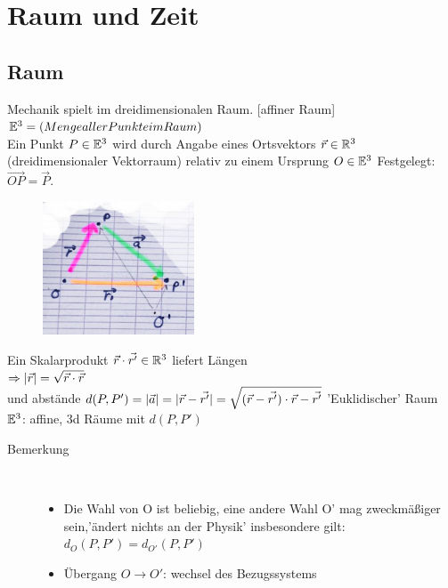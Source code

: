 \section{Raum und Zeit}
\subsection{Raum}
Mechanik spielt im dreidimensionalen Raum. [affiner Raum] $\mathbb{E}^3={\text(Menge aller Punkte im Raum)}$\\
Ein Punkt $P\in\mathbb{E}^3$ wird durch Angabe eines Ortsvektors $\vec{r}\in\mathbb{R}^3$ (dreidimensionaler Vektorraum) relativ zu einem Ursprung $O\in\mathbb{E}^3$ Festgelegt: $\vec{OP}=\vec{P}$.
\begin{figure}[h]
\begin{center}
\includegraphics[width=0.4\textwidth]{Skizzen/Anhang13.jpg}
\end{center}
\caption{}
\end{figure}
Ein Skalarprodukt $\vec{r}\cdot\vec{r'}\in\mathbb{R}^3$ liefert Längen\\
$\Rightarrow|\vec{r}|=\sqrt{\vec{r}\cdot\vec{r}}$\\
und abstände $d(P,P')=|\vec{a}|=|\vec{r}-\vec{r'}|=\sqrt{(\vec{r}-\vec{r'})\cdot\vec{r}-\vec{r'}}$
'Euklidischer' Raum $\mathbb{E}^3$: affine, 3d Räume mit $d(P,P')$\\
\begin{description}
\item[Bemerkung]~\par
\begin{itemize}
\item Die Wahl von O ist beliebig, eine andere Wahl O' mag zweckmäßiger sein,'ändert nichts an der Physik' insbesondere gilt:$d_{O}(P,P')=d_{O'}(P,P')$
\item Übergang $O\rightarrow O'$: wechsel des Bezugssystems
\end{itemize}
\end{description}
